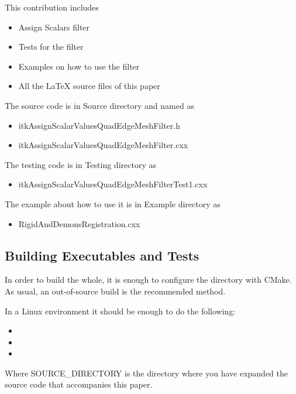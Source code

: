 \documentclass{InsightArticle}
\begin{document}
This contribution includes

\begin{itemize}
\item Assign Scalars filter
\item Tests for the filter
\item Examples on how to use the filter
\item All the LaTeX source files of this paper
\end{itemize}

The source code is in Source directory and named as 

\begin{itemize}
\item itkAssignScalarValuesQuadEdgeMeshFilter.h
\item itkAssignScalarValuesQuadEdgeMeshFilter.cxx
\end{itemize}


The testing code is in Testing directory as

\begin{itemize}
\item itkAssignScalarValuesQuadEdgeMeshFilterTest1.cxx
\end{itemize}

The example about how to use it is in Example directory as

\begin{itemize}
\item RigidAndDemonsRegistration.cxx
\end{itemize}

\subsection{Building Executables and Tests}

In order to build the whole, it is enough to configure the directory with
CMake. As usual, an out-of-source build is the recommended method.

In a Linux environment it should be enough to do the following:

\begin{itemize}
\item {}
\item {}
\item {}
\end{itemize}

Where SOURCE\_DIRECTORY is the directory where you have expanded the source
code that accompanies this paper.
\end{document}
